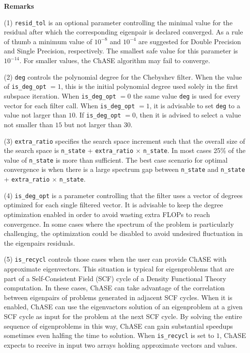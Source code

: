 \documentclass{report}
\begin{document}
\textbf{Remarks}

(1) \texttt{resid\_tol} is an optional parameter controlling the
minimal value for the residual after which the corresponding eigenpair
is declared converged. As a rule of thumb a minimum value of $10^{-8}$
and $10^{-4}$ are suggested for Double Precision and Single Precision,
respectively. The smallest safe value for this parameter is
$10^{-14}$. For smaller values, the ChASE algorithm may fail to converge.


(2) \texttt{deg} controls the polynomial degree for the Chebyshev
filter. When the value of \texttt{is\_deg\_opt} $= 1$, this is the
initial polynomial degree used solely in the first subspace
iteration. When \texttt{is\_deg\_opt} $= 0$ the same value
\texttt{deg} is used for every vector for each filter call. When
\texttt{is\_deg\_opt} $= 1$, it is advisable to set \texttt{deg} to a
value not larger than $10$. If \texttt{is\_deg\_opt} $= 0$, then it is
advised to select a value not smaller than $15$ but not larger than
$30$.

(3) \texttt{extra\_ratio} specifies the search space increment such
that the overall size of the search space is \texttt{n\_state} +
\texttt{extra\_ratio} $\times$ \texttt{n\_state}. In most cases 25\%
of the value of \texttt{n\_state} is more than sufficient. The best
case scenario for optimal convergence is when there is a large
spectrum gap between \texttt{n\_state} and \texttt{n\_state} +
\texttt{extra\_ratio} $\times$ \texttt{n\_state}.

(4) \texttt{is\_deg\_opt} is a parameter controlling that the filter
uses a vector of degrees optimized for each single filtered
vector. It is advisable to keep the degree optimization enabled in order to avoid
wasting extra FLOPs to reach convergence. In some cases where the
spectrum of the problem is particularly challenging, the optimization
could be disabled to avoid undesired fluctuation in the eigenpairs residuals.

(5) \texttt{is\_recycl} controls those cases when the user can provide
ChASE with approximate eigenvectors. This situation is typical for
eigenproblems that are part of  a Self-Consistent Field (SCF) cycle of
a Density Functional Theory computation. In these cases, ChASE can
take advantage of the correlation between eigenpairs of problems generated in
adjacent SCF cycles. When it is enabled, ChASE can use the eigenvactors solution of an
eigenproblem at a given SCF cycle as input for the problem at the next
SCF cycle. By solving the entire sequence of eigenproblems in this
way, ChASE can gain substantial speedups sometimes even halfing the
time to solution. When \texttt{is\_recycl} is set to $1$, ChASE
expects to receive in input two arrays holding approximate vectors and
values.
\end{document}
